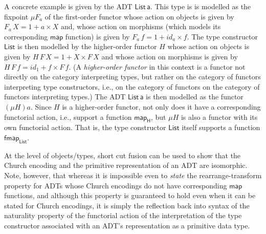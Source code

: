 \documentclass[acmsmall,screen,review,anonymous]{acmart}
\theoremstyle{definition}
\renewcommand{\id}{\mathit{id}}
\begin{document}
A concrete example is given by the ADT $\mathsf{List\,a}$. This type
is is modelled as the fixpoint $\mu F_a$ of the first-order functor
whose action on objects is given by $F_a\,X = 1 + a \times X$ and,
whose action on morphisms (which models its corresponding
$\mathsf{map}$ function) is given by $F_a\,f = 1 + \id_a \times
f$. The type constructor $\mathsf{List}$ is then modelled by the
higher-order functor $H$ whose action on objects is given by $H\,F\,X
= 1 + X \times F\,X$ and whose action on morphisms is given by
$H\,F\,f = \id_1 + f \times F\,f$. (A {\em higher-order functor} in
this context is a functor not directly on the category interpreting
types, but rather on the category of functors interpreting type
constructors, i.e., on the category of functors on the category of
functors interpreting types.) The ADT $\mathsf{List\,a}$ is then
modelled as the functor $(\mu H)a$. Since $H$ is a higher-order
functor, not only does it have a corresponding functorial action,
i.e., support a function $\mathsf{map_H}$, but $\mu H$ is also a
functor with its own functorial action. That is, the type constructor
$\mathsf{List}$ itself supports a function $\mathsf{fmap_{List}}$.

{\color{blue} At the level of objects/types, short cut fusion can be
  used to show that the Church encoding and the primitive
  representation of an ADT are isomorphic.} Note, however, that
whereas it is impossible even to {\em state} the rearrange-transform
property for ADTs whose Church encodings do not have corresponding
$\mathsf{map}$ functions, and although this property is guaranteed to
hold even when it can be stated for Church encodings, it is simply the
reflection back into syntax of the naturality property of the
functorial action of the interpretation of the type constructor
associated with an ADT's representation as a primitive data type.


\end{document}

